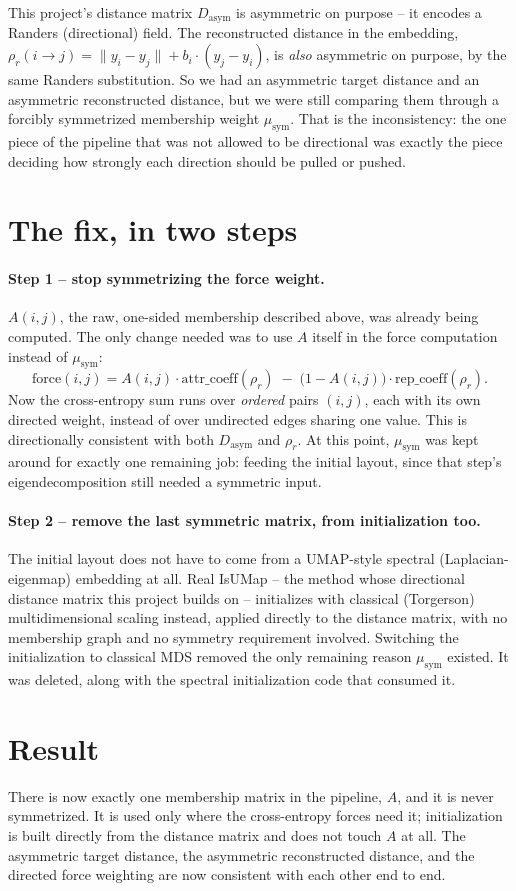 \documentclass[11pt]{article}
\begin{document}
This project's distance matrix $D_{\mathrm{asym}}$ is asymmetric on purpose
-- it encodes a Randers (directional) field. The reconstructed distance in
the embedding, $\rho_r(i\!\to\!j) = \lVert y_i-y_j\rVert + b_i\cdot(y_j-y_i)$,
is \emph{also} asymmetric on purpose, by the same Randers substitution.
So we had an asymmetric target distance and an asymmetric reconstructed
distance, but we were still comparing them through a forcibly symmetrized
membership weight $\mu_{\mathrm{sym}}$. That is the inconsistency: the one
piece of the pipeline that was not allowed to be directional was exactly the
piece deciding how strongly each direction should be pulled or pushed.

\section{The fix, in two steps}

\paragraph{Step 1 -- stop symmetrizing the force weight.}
$A(i,j)$, the raw, one-sided membership described above, was already being
computed. The only change needed was to use $A$ itself in the force
computation instead of $\mu_{\mathrm{sym}}$:
\[
  \text{force}(i,j) = A(i,j)\cdot \mathrm{attr\_coeff}(\rho_r) \;-\; \bigl(1-A(i,j)\bigr)\cdot \mathrm{rep\_coeff}(\rho_r).
\]
Now the cross-entropy sum runs over \emph{ordered} pairs $(i,j)$, each with
its own directed weight, instead of over undirected edges sharing one value.
This is directionally consistent with both $D_{\mathrm{asym}}$ and $\rho_r$.
At this point, $\mu_{\mathrm{sym}}$ was kept around for exactly one remaining
job: feeding the initial layout, since that step's eigendecomposition still
needed a symmetric input.

\paragraph{Step 2 -- remove the last symmetric matrix, from initialization too.}
The initial layout does not have to come from a UMAP-style spectral
(Laplacian-eigenmap) embedding at all. Real IsUMap -- the method whose
directional distance matrix this project builds on -- initializes with
classical (Torgerson) multidimensional scaling instead, applied directly to
the distance matrix, with no membership graph and no symmetry requirement
involved. Switching the initialization to classical MDS removed the only
remaining reason $\mu_{\mathrm{sym}}$ existed. It was deleted, along with the
spectral initialization code that consumed it.

\section{Result}

There is now exactly one membership matrix in the pipeline, $A$, and it is
never symmetrized. It is used only where the cross-entropy forces need it;
initialization is built directly from the distance matrix and does not touch
$A$ at all. The asymmetric target distance, the asymmetric reconstructed
distance, and the directed force weighting are now consistent with each
other end to end.
\end{document}
